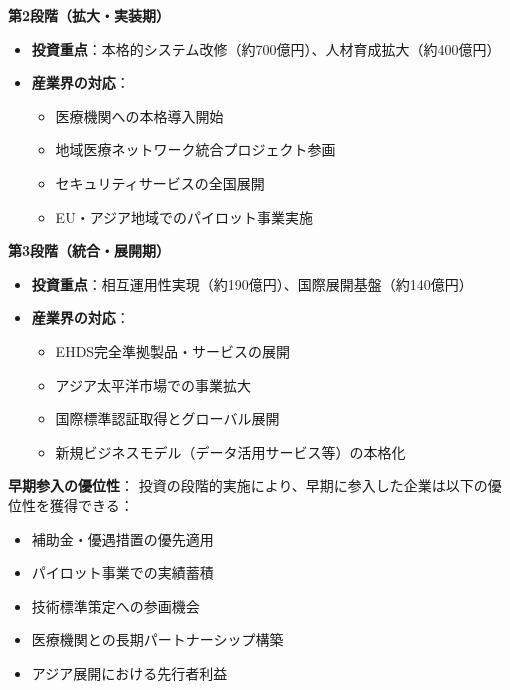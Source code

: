 \documentclass[
  a4paper,
  a4paper,
  11pt]{ltjsbook}
\providecommand{\tightlist}{%
  \setlength{\itemsep}{0pt}\setlength{\parskip}{0pt}}
\begin{document}
\textbf{第2段階（拡大・実装期）}

\begin{itemize}
\tightlist
\item
  \textbf{投資重点}：本格的システム改修（約700億円）、人材育成拡大（約400億円）
\item
  \textbf{産業界の対応}：

  \begin{itemize}
  \tightlist
  \item
    医療機関への本格導入開始
  \item
    地域医療ネットワーク統合プロジェクト参画
  \item
    セキュリティサービスの全国展開
  \item
    EU・アジア地域でのパイロット事業実施
  \end{itemize}
\end{itemize}

\textbf{第3段階（統合・展開期）}

\begin{itemize}
\tightlist
\item
  \textbf{投資重点}：相互運用性実現（約190億円）、国際展開基盤（約140億円）
\item
  \textbf{産業界の対応}：

  \begin{itemize}
  \tightlist
  \item
    EHDS完全準拠製品・サービスの展開
  \item
    アジア太平洋市場での事業拡大
  \item
    国際標準認証取得とグローバル展開
  \item
    新規ビジネスモデル（データ活用サービス等）の本格化
  \end{itemize}
\end{itemize}

\begin{tcolorbox}[enhanced jigsaw, toprule=.15mm, bottomtitle=1mm, coltitle=black, left=2mm, opacityback=0, arc=.35mm, colbacktitle=quarto-callout-tip-color!10!white, colback=white, opacitybacktitle=0.6, bottomrule=.15mm, rightrule=.15mm, breakable, title=\textcolor{quarto-callout-tip-color}{\faLightbulb}\hspace{0.5em}{Tip}, toptitle=1mm, titlerule=0mm, colframe=quarto-callout-tip-color-frame, leftrule=.75mm]

\textbf{早期参入の優位性}：
投資の段階的実施により、早期に参入した企業は以下の優位性を獲得できる：

\begin{itemize}
\tightlist
\item
  補助金・優遇措置の優先適用
\item
  パイロット事業での実績蓄積
\item
  技術標準策定への参画機会
\item
  医療機関との長期パートナーシップ構築
\item
  アジア展開における先行者利益
\end{itemize}

\end{tcolorbox}
\end{document}
